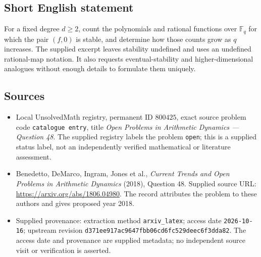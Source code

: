 \documentclass[11pt]{article}
\newcommand{\F}{\mathbb{F}}
\begin{document}
\subsection{Short English statement}
For a fixed degree \(d\ge2\), count the polynomials and rational functions over \(\F_q\) for which the pair \((f,0)\) is stable, and determine how those counts grow as \(q\) increases. The supplied excerpt leaves stability undefined and uses an undefined rational-map notation. It also requests eventual-stability and higher-dimensional analogues without enough details to formulate them uniquely.
\subsection{Sources}
\begin{itemize}
\item Local UnsolvedMath registry, permanent ID \(800425\), exact source problem code \texttt{catalogue entry}, title \emph{Open Problems in Arithmetic Dynamics --- Question 48}. The supplied registry labels the problem \texttt{open}; this is a supplied status label, not an independently verified mathematical or literature assessment.
\item Benedetto, DeMarco, Ingram, Jones et al., \emph{Current Trends and Open Problems in Arithmetic Dynamics} (2018), Question 48. Supplied source URL: \url{https://arxiv.org/abs/1806.04980}. The record attributes the problem to these authors and gives proposed year 2018.
\item Supplied provenance: extraction method \texttt{arxiv\_latex}; access date \texttt{2026-10-16}; upstream revision \texttt{d371ee917ac9647fbb06cd6fc529deec6f3dda82}. The access date and provenance are supplied metadata; no independent source visit or verification is asserted.
\end{itemize}
\end{document}
